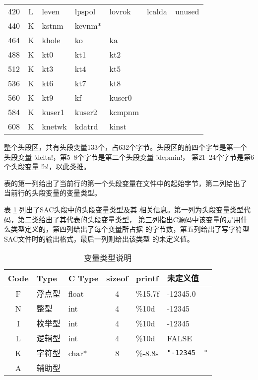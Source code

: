 \begin{table}[H]
\begin{tabular}{c|c|lllll}
420		&	L	&	leven	&	lpspol	&	lovrok	&	lcalda	&	unused	\\
440		&	K	&	kstnm	&	kevnm*	&			&			&			\\
464		&	K	&	khole	&	ko		&	ka		&			&			\\
488		&	K	&	kt0		&	kt1		&	kt2		&			&			\\
512		&	K	&	kt3		&	kt4		&	kt5		&			&			\\
536		&	K	&	kt6		&	kt7		&	kt8		&			&			\\
560		&	K	&	kt9		&	kf		&	kuser0	&			&			\\
584		&	K	&	kuser1	&	kuser2	&	kcmpnm	&			&			\\
608		&	K	&	knetwk	&	kdatrd	&	kinst	&			&			\\
\bottomrule
\end{tabular}
\end{table}

整个头段区，共有头段变量133个，占632个字节。头段区的前四个字节是第一个
头段变量 !delta!，第5--8个字节是第二个头段变量 !depmin!，
第21--24个字节是第6个头段变量 !b!，以此类推。

表的第一列给出了当前行的第一个头段变量在文件中的起始字节，第二列给出了
当前行的头段变量的变量类型。

表 \ref{table:header-variables-type} 列出了SAC头段中的头段变量类型及其
相关信息。第一列为头段变量类型代码，第二类给出了其代表的头段变量类型，
第三列指出C源码中该变量的是用什么类型定义的，第四列给出了每个变量所占据
的字节数，第五列给出了写字符型SAC文件时的输出格式，最后一列则给出该类型
的未定义值。

\begin{table}[H]
\caption{变量类型说明}
\label{table:header-variables-type}
\centering
\ttfamily
\small
\begin{tabular}{cllcll}
\toprule
Code    &	Type        &   C Type & sizeof &   printf	&   未定义值        \\
\midrule
F		&	浮点型		&   float  &  4     &	\%15.7f &   -12345.0        \\
N		&	整型		&   int    &  4     &	\%10d   &   -12345        \\
I		&	枚举型		&   int    &  4     &	\%10d   &   -12345	        \\
L		&	逻辑型		&   int    &  4     &	\%10d   &   FALSE        \\
K		&	字符型		&   char*  &  8     &	\%-8.8s & \lstinline[showspaces=true]!"-12345  "!     \\
A		&	辅助型		&          &        &			& 	    \\
\bottomrule
\end{tabular}
\end{table}

